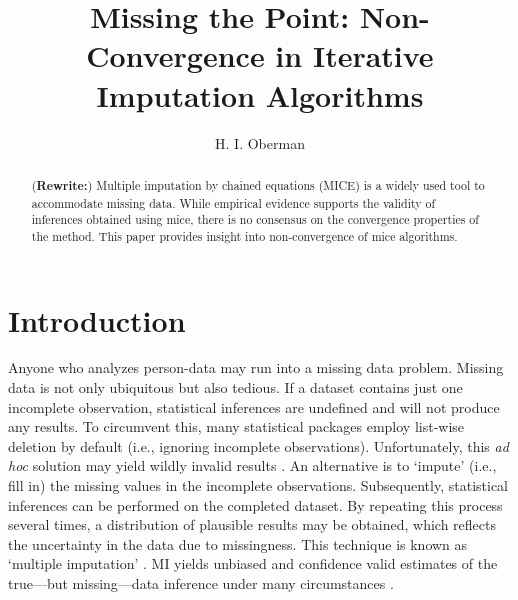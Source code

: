 \documentclass[Royal,times,sageh]{sagej}
\begin{document}
\title{Missing the Point: Non-Convergence in Iterative Imputation Algorithms}


\author{H. I. Oberman}




\begin{abstract}
(\textbf{Rewrite:}) Multiple imputation by chained equations (MICE) is a
widely used tool to accommodate missing data. While empirical evidence
supports the validity of inferences obtained using mice, there is no
consensus on the convergence properties of the method. This paper
provides insight into non-convergence of mice algorithms.
\end{abstract}


\maketitle

\hypertarget{introduction}{%
\section{Introduction}\label{introduction}}

Anyone who analyzes person-data may run into a missing data problem.
Missing data is not only ubiquitous but also tedious. If a dataset
contains just one incomplete observation, statistical inferences are
undefined and will not produce any results. To circumvent this, many
statistical packages employ list-wise deletion by default (i.e.,
ignoring incomplete observations). Unfortunately, this \emph{ad hoc}
solution may yield wildly invalid results \citep{buur18}. An alternative
is to `impute' (i.e., fill in) the missing values in the incomplete
observations. Subsequently, statistical inferences can be performed on
the completed dataset. By repeating this process several times, a
distribution of plausible results may be obtained, which reflects the
uncertainty in the data due to missingness. This technique is known as
`multiple imputation' \citep[MI;][]{rubin76}. MI yields unbiased and
confidence valid estimates of the true---but missing---data inference
under many circumstances \citep{buur18}.
\end{document}
